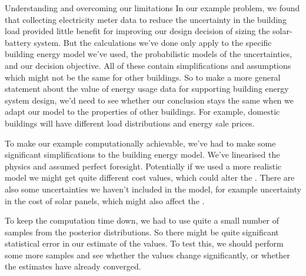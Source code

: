 \begin{ebox}{Understanding and overcoming our limitations}
    In our example problem, we found that collecting electricity meter data to reduce the uncertainty in the building load provided little benefit for improving our design decision of sizing the solar-battery system. But the calculations we've done only apply to the specific building energy model we've used, the probabilistic models of the uncertainties, and our decision objective. All of these contain simplifications and assumptions which might not be the same for other buildings. So to make a more general statement about the value of energy usage data for supporting building energy system design, we'd need to see whether our conclusion stays the same when we adapt our model to the properties of other buildings. For example, domestic buildings will have different load distributions and energy sale prices.

    To make our example computationally achievable, we've had to make some significant simplifications to the building energy model. We've linearised the physics and assumed perfect foresight. Potentially if we used a more realistic model we might get quite different cost values, which could alter the . There are also some uncertainties we haven't included in the model, for example uncertainty in the cost of solar panels, which might also affect the .

    To keep the computation time down, we had to use quite a small number of samples from the posterior distributions. So there might be quite significant statistical error in our estimate of the  values. To test this, we should perform some more samples and see whether the  values change significantly, or whether the estimates have already converged.
\end{ebox}\





